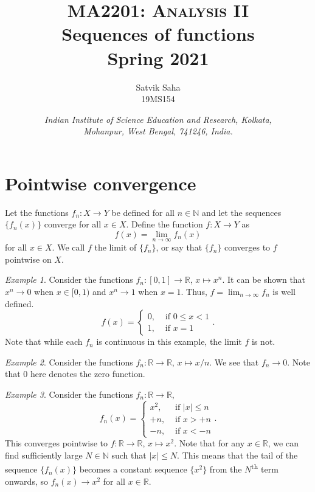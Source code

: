 \documentclass[11pt]{article}
\title{
    \Large\textsc{MA2201: Analysis II} \\
    \Huge \textbf{Sequences of functions} \\
    \vspace{5pt}
    \Large{Spring 2021}
}
\author{
    \large Satvik Saha%
    \\\textsc{\small 19MS154}
}
\date{\normalsize
    \textit{Indian Institute of Science Education and Research, Kolkata, \\
    Mohanpur, West Bengal, 741246, India.} \\
}
\def\R{\mathbb{R}}
\def\N{\mathbb{N}}
\theoremstyle{definition}
\theoremstyle{remark}
\newtheorem*{example}{Example}
\numberwithin{equation}{module}
\begin{document}
    \maketitle
    
    \section*{Pointwise convergence}
    \begin{definition}
        Let the functions $f_n\colon X \to Y$ be defined for all $n \in \mathbb{N}$
        and let the sequences $\{f_n(x)\}$ converge for all $x \in X$. Define the
        function $f\colon X \to Y$ as \[
            f(x) = \lim_{n \to \infty} f_n(x) 
        \] for all $x \in X$. We call $f$ the limit of $\{f_n\}$, or say that
        $\{f_n\}$ converges to $f$ pointwise on $X$.
    \end{definition}
    \begin{example}
        Consider the functions $f_n\colon [0, 1] \to \R$, $x \mapsto x^n$.
        It can be shown that $x^n \to 0$ when $x \in [0, 1)$ and 
        $x^n \to 1$ when $x = 1$. Thus, $f = \lim_{n \to \infty} f_n$ is well
        defined. \[
            f(x) = \begin{cases}
                0, &\text{ if } 0 \leq x < 1 \\
                1, &\text{ if } x = 1
            \end{cases}.
        \] 
        Note that while each $f_n$ is continuous in this example, the limit $f$
        is not.
    \end{example}
    \begin{example}
        Consider the functions $f_n\colon \R \to \R$, $x \mapsto x/n$.
        We see that $f_n \to 0$. Note that $0$ here denotes the zero function.
    \end{example}
    \begin{example}
        Consider the functions $f_n\colon \R \to \R$, \[
            f_n(x) = \begin{cases}
                x^2, &\text{ if }|x| \leq n\\
                +n, &\text{ if } x > +n \\
                -n, &\text{ if } x < -n
            \end{cases}.
        \] 
        This converges pointwise to $f\colon \R \to \R$, $x \mapsto x^2$.
        Note that for any $x \in \R$, we can find sufficiently large $N \in \N$ such
        that $|x| \leq N$.  This means that the tail of the sequence $\{f_n(x)\}$
        becomes a constant sequence $\{x^2\}$ from the $N$\textsuperscript{th} term
        onwards, so $f_n(x) \to x^2$ for all $x \in \R$.
    \end{example}
\end{document}
